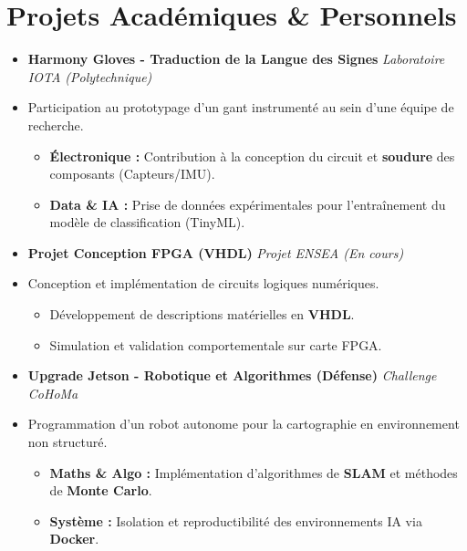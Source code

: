 \documentclass[a4paper,11pt]{article}
\begin{document}
\section{Projets Académiques \& Personnels}
\begin{itemize}[leftmargin=*, label={-}]
\item \textbf{Harmony Gloves - Traduction de la Langue des Signes} \hfill \textit{Laboratoire IOTA (Polytechnique)}
\vspace{-2pt}
\item \small{Participation au prototypage d'un gant instrumenté au sein d'une équipe de recherche.}
    \begin{itemize}[leftmargin=0.4cm, nosep, label=\tiny$\bullet$]
        \item \small{\textbf{Électronique :} Contribution à la conception du circuit et \textbf{soudure} des composants (Capteurs/IMU).}
        \item \small{\textbf{Data \& IA :} Prise de données expérimentales pour l'entraînement du modèle de classification (TinyML).}
    \end{itemize}
    \vspace{1pt}

\item \textbf{Projet Conception FPGA (VHDL)} \hfill \textit{Projet ENSEA (En cours)}
\vspace{-2pt}
\item \small{Conception et implémentation de circuits logiques numériques.}
    \begin{itemize}[leftmargin=0.4cm, nosep, label=\tiny$\bullet$]
        \item \small{Développement de descriptions matérielles en \textbf{VHDL}.}
        \item \small{Simulation et validation comportementale sur carte FPGA.}
    \end{itemize}
    \vspace{1pt}

\item \textbf{Upgrade Jetson - Robotique et Algorithmes (Défense)} \hfill \textit{Challenge CoHoMa}
\vspace{-2pt}
\item \small{Programmation d'un robot autonome pour la cartographie en environnement non structuré.}
    \begin{itemize}[leftmargin=0.4cm, nosep, label=\tiny$\bullet$]
        \item \small{\textbf{Maths \& Algo :} Implémentation d'algorithmes de \textbf{SLAM} et méthodes de \textbf{Monte Carlo}.}
        \item \small{\textbf{Système :} Isolation et reproductibilité des environnements IA via \textbf{Docker}.}
    \end{itemize}
    \vspace{1pt}




\end{itemize}
\end{document}
